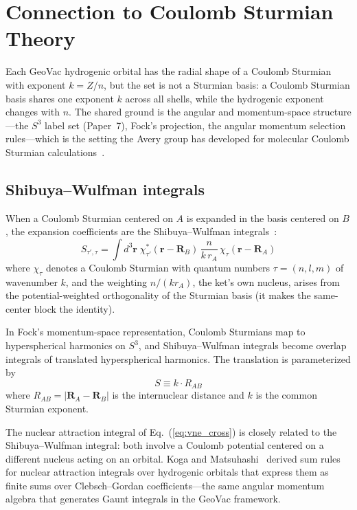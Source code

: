 \documentclass[aps,pra,twocolumn,superscriptaddress,longbibliography]{revtex4-2}
\begin{document}
\section{Connection to Coulomb Sturmian Theory}
\label{sec:sturmian}

Each GeoVac hydrogenic orbital has the radial shape of a Coulomb
Sturmian with exponent $k = Z/n$, but the set is not a Sturmian basis:
a Coulomb Sturmian basis shares one exponent $k$ across all shells, while
the hydrogenic exponent changes with $n$.  The shared ground is the
angular and momentum-space structure---the $S^3$ label set (Paper~7),
Fock's projection, the angular momentum selection rules---which is the
setting the Avery group has developed for molecular Coulomb Sturmian
calculations~\cite{avery2000,avery2004,avery2012,avery2014}.

\subsection{Shibuya--Wulfman integrals}

When a Coulomb Sturmian centered on $A$ is expanded in the basis
centered on $B$, the expansion coefficients are the Shibuya--Wulfman
integrals~\cite{shibuya1965}:
\begin{equation}
\label{eq:sw}
S_{\tau', \tau} = \int d^3\mathbf{r}\; \chi_{\tau'}^*(\mathbf{r} -
\mathbf{R}_B)\, \frac{n}{k\,r_A}\, \chi_\tau(\mathbf{r} - \mathbf{R}_A)
\end{equation}
where $\chi_\tau$ denotes a Coulomb Sturmian with quantum numbers
$\tau = (n, l, m)$ of wavenumber $k$, and the weighting $n/(k r_A)$, the
ket's own nucleus, arises from the potential-weighted orthogonality of
the Sturmian basis (it makes the same-center block the identity).

In Fock's momentum-space representation, Coulomb Sturmians map to
hyperspherical harmonics on $S^3$, and Shibuya--Wulfman integrals
become overlap integrals of translated hyperspherical harmonics.
The translation is parameterized by
\begin{equation}
S \equiv k \cdot R_{AB}
\end{equation}
where $R_{AB} = |\mathbf{R}_A - \mathbf{R}_B|$ is the internuclear
distance and $k$ is the common Sturmian exponent.

The nuclear attraction integral of Eq.~(\ref{eq:vne_cross}) is
closely related to the Shibuya--Wulfman integral: both involve a
Coulomb potential centered on a different nucleus acting on an orbital.
Koga and Matsuhashi~\cite{koga1987} derived sum rules for nuclear
attraction integrals over hydrogenic orbitals that express them as
finite sums over Clebsch--Gordan coefficients---the same angular
momentum algebra that generates Gaunt integrals in the GeoVac
framework.
\end{document}
